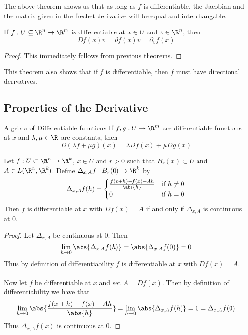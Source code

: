 \documentclass[a4paper]{article}
\begin{document}
The above theorem shows us that as long as $f$ is differentiable, the Jacobian and the matrix given in the frechet derivative will be equal and interchangable. 

\begin{lmm}{}{} If $f:U\subseteq\R^n\to\R^m$ is differentiable at $x\in U$ and $v\in\R^n$, then $$Df(x)v=\partial f(x)v=\partial_vf(x)$$ \tcbline
\begin{proof}
This immediately follows from previous theorems. 
\end{proof}
\end{lmm}

This theorem also shows that if $f$ is differentiable, then $f$ must have directional derivatives. 

\subsection{Properties of the Derivative}
\begin{thm}{Algebra of Differentiable functions}{} If $f,g:U\to\R^m$ are differentiable functions at $x $ and $\lambda,\mu\in\R$ are constants, then $$D(\lambda f+\mu g)(x )=\lambda Df(x )+\mu Dg(x )$$
\end{thm}

\begin{lmm}{}{} Let $f:U\subset\R^n\to\R^k$, $x\in U$ and $r>0$ such that $B_r(x)\subset U$ and $A\in L(\R^n,\R^k)$. Define $\Delta_{x,A}f:B_r(0)\to\R^k$ by $$\Delta_{x,A}f(h)=\begin{cases}
\frac{f(x+h)-f(x)-Ah}{\abs{h}} & \text{if $h\neq0$}\\
0 & \text{if $h=0$}
\end{cases}$$
Then $f$ is differentiable at $x$ with $Df(x)=A$ if and only if $\Delta_{x,A}$ is continuous at $0$. \tcbline
\begin{proof}
Let $\Delta_{x,A}$ be continuous at $0$. Then $$\lim_{h\to 0}\abs{\Delta_{x,A}f(h)}=\abs{\Delta_{x,A}f(0)}=0$$ Thus by definition of differentiability $f$ is differentiable at $x$ with $Df(x)=A$. \\~\\
Now let $f$ be differentiable at $x$ and set $A=Df(x)$. Then by definition of differentiability we have that $$\lim_{h\to 0}\abs{\frac{f(x+h)-f(x)-Ah}{\abs{h}}}=\lim_{h\to 0}\abs{\Delta_{x,A}f(h)}=0=\Delta_{x,A}f(0)$$ Thus $\Delta_{x,A}f(x)$ is continuous at $0$. 
\end{proof}
\end{lmm}
\end{document}
